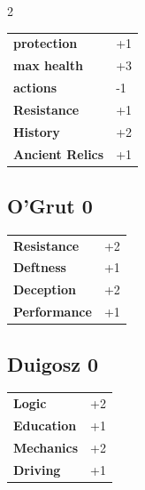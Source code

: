 \begin{multicols}{2}
\begin{tcolorbox}
\begin{tabular}{@{}ll@{}}
    \textbf{protection} & +1\\
    \textbf{max health} & +3\\
    \textbf{actions} & -1\\
    \textbf{Resistance} & +1\\
    \textbf{History} & +2\\
    \textbf{Ancient Relics} & +1\\
\end{tabular}


\end{tcolorbox}

\begin{tcolorbox}
    \subsection*{O'Grut \hfill \small{0 }}
    \tcblower




\begin{tabular}{@{}ll@{}}
    \textbf{Resistance} & +2\\
    \textbf{Deftness} & +1\\
    \textbf{Deception} & +2\\
    \textbf{Performance} & +1\\
\end{tabular}


\end{tcolorbox}

\begin{tcolorbox}
    \subsection*{Duigosz \hfill \small{0 }}
    \tcblower




\begin{tabular}{@{}ll@{}}
    \textbf{Logic} & +2\\
    \textbf{Education} & +1\\
    \textbf{Mechanics} & +2\\
    \textbf{Driving} & +1\\
\end{tabular}


\end{tcolorbox}
\end{multicols}
